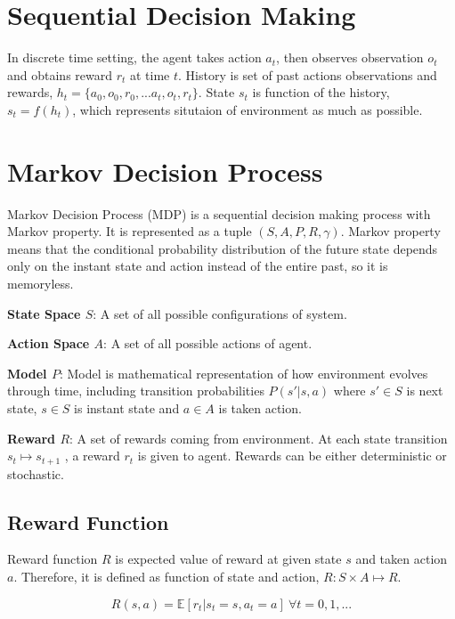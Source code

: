 \section{Sequential Decision Making}

In discrete time setting, the agent takes action $a_t$, then observes observation $o_t$ and obtains reward $r_t$ at time $t$. History is set of past actions observations and rewards, $h_t=\{ a_0, o_0, r_0, ... a_t, o_t, r_t\}$. State $s_t$ is function of the history, $s_t=f(h_t)$, which represents situtaion of environment as much as possible.

\section{Markov Decision Process}
\label{sec:mdp}

Markov Decision Process (MDP) is a sequential decision making process with Markov property. It is represented as a tuple $(S,A,P,R,\gamma)$. Markov property means that the conditional probability distribution of the future state depends only on the instant state and action instead of the entire past, so it is memoryless. 

\textbf{State Space $S$}: A set of all possible configurations of system. 

\textbf{Action Space $A$}: A set of all possible actions of agent.

\textbf{Model $P$}: Model is mathematical representation of how environment evolves through time, including transition probabilities $P(s'|s,a)$ where $s' \in S$ is next state, $s \in S$ is instant state and $a \in A$ is taken action. 

\textbf{Reward $R$}: A set of rewards coming from environment. At each state transition $s_t \mapsto s_{t+1}$ , a reward $r_t$ is given to agent. Rewards can be either deterministic or stochastic.

\subsection{Reward Function}
Reward function $R$ is expected value of reward at given state $s$ and taken action $a$. Therefore, it is defined as function of state and action, $R \colon S \times A \mapsto R$.

\begin{equation}
R(s,a) = \mathbb{E}[r_t|s_t=s, a_t=a] \: \forall t = 0,1, ...
\end{equation}

